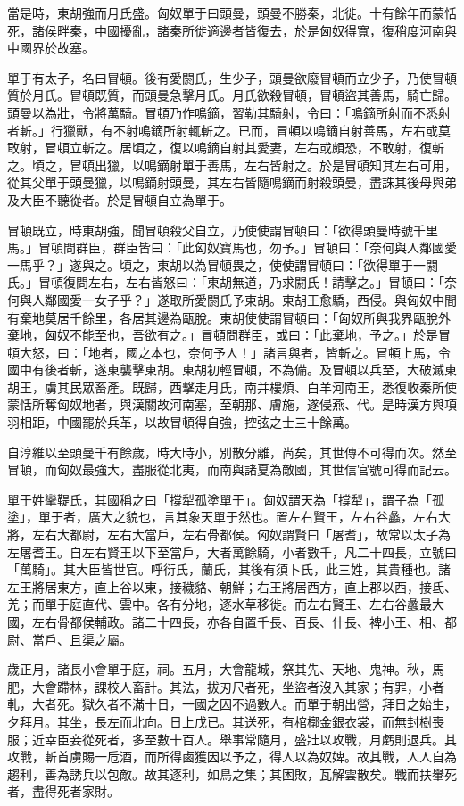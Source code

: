 \begin{pinyinscope}
當是時，東胡強而月氏盛。匈奴單于曰頭曼，頭曼不勝秦，北徙。十有餘年而蒙恬死，諸侯畔秦，中國擾亂，諸秦所徙適邊者皆復去，於是匈奴得寬，復稍度河南與中國界於故塞。

單于有太子，名曰冒頓。後有愛閼氏，生少子，頭曼欲廢冒頓而立少子，乃使冒頓質於月氏。冒頓既質，而頭曼急擊月氏。月氏欲殺冒頓，冒頓盜其善馬，騎亡歸。頭曼以為壯，令將萬騎。冒頓乃作鳴鏑，習勒其騎射，令曰：「鳴鏑所射而不悉射者斬。」行獵獸，有不射鳴鏑所射輒斬之。已而，冒頓以鳴鏑自射善馬，左右或莫敢射，冒頓立斬之。居頃之，復以鳴鏑自射其愛妻，左右或頗恐，不敢射，復斬之。頃之，冒頓出獵，以鳴鏑射單于善馬，左右皆射之。於是冒頓知其左右可用，從其父單于頭曼獵，以鳴鏑射頭曼，其左右皆隨鳴鏑而射殺頭曼，盡誅其後母與弟及大臣不聽從者。於是冒頓自立為單于。

冒頓既立，時東胡強，聞冒頓殺父自立，乃使使謂冒頓曰：「欲得頭曼時號千里馬。」冒頓問群臣，群臣皆曰：「此匈奴寶馬也，勿予。」冒頓曰：「奈何與人鄰國愛一馬乎？」遂與之。頃之，東胡以為冒頓畏之，使使謂冒頓曰：「欲得單于一閼氏。」冒頓復問左右，左右皆怒曰：「東胡無道，乃求閼氏！請擊之。」冒頓曰：「奈何與人鄰國愛一女子乎？」遂取所愛閼氏予東胡。東胡王愈驕，西侵。與匈奴中間有棄地莫居千餘里，各居其邊為甌脫。東胡使使謂冒頓曰：「匈奴所與我界甌脫外棄地，匈奴不能至也，吾欲有之。」冒頓問群臣，或曰：「此棄地，予之。」於是冒頓大怒，曰：「地者，國之本也，奈何予人！」諸言與者，皆斬之。冒頓上馬，令國中有後者斬，遂東襲擊東胡。東胡初輕冒頓，不為備。及冒頓以兵至，大破滅東胡王，虜其民眾畜產。既歸，西擊走月氏，南并樓煩、白羊河南王，悉復收秦所使蒙恬所奪匈奴地者，與漢關故河南塞，至朝那、膚施，遂侵燕、代。是時漢方與項羽相距，中國罷於兵革，以故冒頓得自強，控弦之士三十餘萬。

自淳維以至頭曼千有餘歲，時大時小，別散分離，尚矣，其世傳不可得而次。然至冒頓，而匈奴最強大，盡服從北夷，而南與諸夏為敵國，其世信官號可得而記云。

單于姓攣鞮氏，其國稱之曰「撐犁孤塗單于」。匈奴謂天為「撐犁」，謂子為「孤塗」，單于者，廣大之貌也，言其象天單于然也。置左右賢王，左右谷蠡，左右大將，左右大都尉，左右大當戶，左右骨都侯。匈奴謂賢曰「屠耆」，故常以太子為左屠耆王。自左右賢王以下至當戶，大者萬餘騎，小者數千，凡二十四長，立號曰「萬騎」。其大臣皆世官。呼衍氏，蘭氏，其後有須卜氏，此三姓，其貴種也。諸左王將居東方，直上谷以東，接穢貉、朝鮮；右王將居西方，直上郡以西，接氐、羌；而單于庭直代、雲中。各有分地，逐水草移徙。而左右賢王、左右谷蠡最大國，左右骨都侯輔政。諸二十四長，亦各自置千長、百長、什長、裨小王、相、都尉、當戶、且渠之屬。

歲正月，諸長小會單于庭，祠。五月，大會龍城，祭其先、天地、鬼神。秋，馬肥，大會蹛林，課校人畜計。其法，拔刃尺者死，坐盜者沒入其家；有罪，小者軋，大者死。獄久者不滿十日，一國之囚不過數人。而單于朝出營，拜日之始生，夕拜月。其坐，長左而北向。日上戊已。其送死，有棺槨金銀衣裳，而無封樹喪服；近幸臣妾從死者，多至數十百人。舉事常隨月，盛壯以攻戰，月虧則退兵。其攻戰，斬首虜賜一卮酒，而所得鹵獲因以予之，得人以為奴婢。故其戰，人人自為趨利，善為誘兵以包敵。故其逐利，如鳥之集；其困敗，瓦解雲散矣。戰而扶轝死者，盡得死者家財。


\end{pinyinscope}

